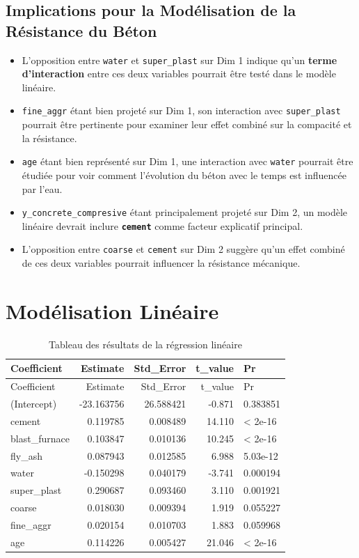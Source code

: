 \documentclass[
  12pt,
]{article}
\providecommand{\tightlist}{%
  \setlength{\itemsep}{0pt}\setlength{\parskip}{0pt}}
\begin{document}
\subsection{Implications pour la Modélisation de la Résistance du
Béton}\label{implications-pour-la-moduxe9lisation-de-la-ruxe9sistance-du-buxe9ton}

\begin{itemize}
\tightlist
\item
  L'opposition entre \texttt{water} et \texttt{super\_plast} sur Dim 1
  indique qu'un \textbf{terme d'interaction} entre ces deux variables
  pourrait être testé dans le modèle linéaire.
\item
  \texttt{fine\_aggr} étant bien projeté sur Dim 1, son interaction avec
  \texttt{super\_plast} pourrait être pertinente pour examiner leur
  effet combiné sur la compacité et la résistance.
\item
  \texttt{age} étant bien représenté sur Dim 1, une interaction avec
  \texttt{water} pourrait être étudiée pour voir comment l'évolution du
  béton avec le temps est influencée par l'eau.
\item
  \texttt{y\_concrete\_compresive} étant principalement projeté sur Dim
  2, un modèle linéaire devrait inclure \textbf{\texttt{cement}} comme
  facteur explicatif principal.
\item
  L'opposition entre \texttt{coarse} et \texttt{cement} sur Dim 2
  suggère qu'un effet combiné de ces deux variables pourrait influencer
  la résistance mécanique.
\end{itemize}

\section{Modélisation Linéaire}\label{moduxe9lisation-linuxe9aire}

\begin{longtable}[]{@{}lrrrl@{}}
\caption{Tableau des résultats de la régression linéaire}\tabularnewline
\toprule\noalign{}
Coefficient & Estimate & Std\_Error & t\_value & Pr \\
\midrule\noalign{}
\endfirsthead
\toprule\noalign{}
Coefficient & Estimate & Std\_Error & t\_value & Pr \\
\midrule\noalign{}
\endhead
\bottomrule\noalign{}
\endlastfoot
(Intercept) & -23.163756 & 26.588421 & -0.871 & 0.383851 \\
cement & 0.119785 & 0.008489 & 14.110 & \textless{} 2e-16 \\
blast\_furnace & 0.103847 & 0.010136 & 10.245 & \textless{} 2e-16 \\
fly\_ash & 0.087943 & 0.012585 & 6.988 & 5.03e-12 \\
water & -0.150298 & 0.040179 & -3.741 & 0.000194 \\
super\_plast & 0.290687 & 0.093460 & 3.110 & 0.001921 \\
coarse & 0.018030 & 0.009394 & 1.919 & 0.055227 \\
fine\_aggr & 0.020154 & 0.010703 & 1.883 & 0.059968 \\
age & 0.114226 & 0.005427 & 21.046 & \textless{} 2e-16 \\
\end{longtable}
\end{document}
